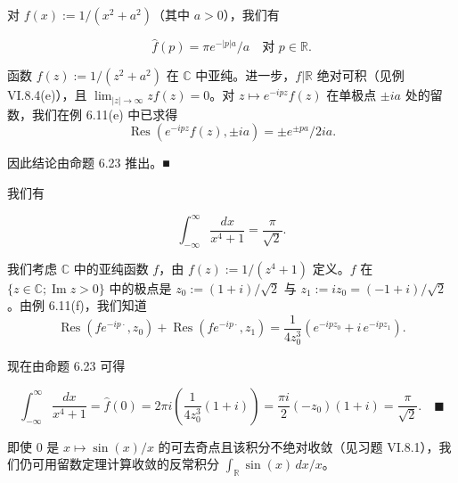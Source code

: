 \begin{example}

\begin{items}
\item

对 $ f(x) := 1/(x^{2} + a^{2}) $（其中 $ a > 0 $），我们有

\[
\widehat{f}(p) = \pi e^{-|p|a}/a \quad \text{对 } p \in \mathbb{R} .
\]

\proofhead
函数 $ f(z) := 1/(z^{2} + a^{2}) $ 在 $ \mathbb{C} $ 中亚纯。进一步，$ f|\mathbb{R} $ 绝对可积（见例 VI.8.4(e)），且 $ \lim_{|z|\to\infty}zf(z) = 0 $。对 $ z \mapsto e^{-ipz}f(z) $ 在单极点 $ \pm ia $ 处的留数，我们在例 6.11(e) 中已求得
\[
\operatorname{Res}\left(e^{-ipz}f(z),\pm ia\right) = \pm e^{\pm pa}/2ia .
\]

因此结论由命题 6.23 推出。\nobreak\hspace{0.35em}■

\item

我们有

\[
\int_{-\infty}^{\infty}\frac{dx}{x^{4} + 1} = \frac{\pi}{\sqrt{2}} .
\]

\proofhead
我们考虑 $ \mathbb{C} $ 中的亚纯函数 $ f $，由 $ f(z) := 1/(z^{4} + 1) $ 定义。$ f $ 在 $ \{z \in \mathbb{C} ; \operatorname{Im} z > 0\} $ 中的极点是 $ z_{0} := (1 + i)/\sqrt{2} $ 与 $ z_{1} := iz_{0} = (-1 + i)/\sqrt{2} $。由例 6.11(f)，我们知道
\[
\operatorname{Res}(f e^{-ip\cdot},z_{0}) + \operatorname{Res}(f e^{-ip\cdot},z_{1}) = \frac{1}{4z_{0}^{3}}\left(e^{-ipz_{0}} + i\,e^{-ipz_{1}}\right) .
\]

现在由命题 6.23 可得

\[
\int_{-\infty}^{\infty}\frac{dx}{x^{4} + 1} = \widehat{f}(0) = 2\pi i\left(\frac{1}{4z_{0}^{3}}(1 + i)\right) = \frac{\pi i}{2}(-z_{0})(1 + i) = \frac{\pi}{\sqrt{2}} .\quad\blacksquare
\]

即使 $ 0 $ 是 $ x \mapsto \sin(x)/x $ 的可去奇点且该积分不绝对收敛（见习题 VI.8.1），我们仍可用留数定理计算收敛的反常积分 $ \int_{\mathbb{R}}\sin(x)\,dx/x $。

\end{items}

\end{example}

